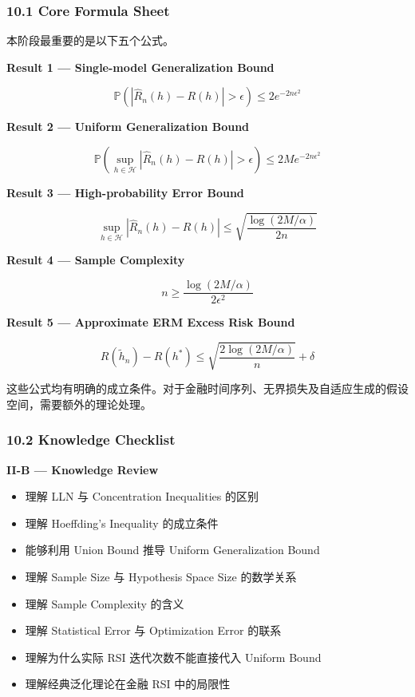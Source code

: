 \hypertarget{part-2-14-0001-core-formula-sheet}{%
\subsubsection{10.1 Core Formula Sheet}\label{part-2-14-0001-core-formula-sheet}}

本阶段最重要的是以下五个公式。

\textbf{Result 1 --- Single-model Generalization Bound}

\[\boxed{
\mathbb P(|\widehat R_n(h)-R(h)|>\epsilon)
\leq2e^{-2n\epsilon^2}
}\]

\textbf{Result 2 --- Uniform Generalization Bound}

\[\boxed{
\mathbb P
\left(
\sup_{h\in\mathcal H}
|\widehat R_n(h)-R(h)|>\epsilon
\right)
\leq2Me^{-2n\epsilon^2}
}\]

\textbf{Result 3 --- High-probability Error Bound}

\[\boxed{
\sup_{h\in\mathcal H}
|\widehat R_n(h)-R(h)|
\leq
\sqrt{\frac{\log(2M/\alpha)}{2n}}
}\]

\textbf{Result 4 --- Sample Complexity}

\[\boxed{
n\geq
\frac{\log(2M/\alpha)}{2\epsilon^2}
}\]

\textbf{Result 5 --- Approximate ERM Excess Risk Bound}

\[\boxed{
R(\tilde h_n)-R(h^*)
\leq
\sqrt{\frac{2\log(2M/\alpha)}n}+\delta
}\]

这些公式均有明确的成立条件。对于金融时间序列、无界损失及自适应生成的假设空间，需要额外的理论处理。

\hypertarget{part-2-14-0001-knowledge-checklist}{%
\subsubsection{10.2 Knowledge Checklist}\label{part-2-14-0001-knowledge-checklist}}

\textbf{II-B --- Knowledge Review}

\begin{itemize}
\item
  理解 LLN 与 Concentration Inequalities 的区别
\item
  理解 Hoeffding's Inequality 的成立条件
\item
  能够利用 Union Bound 推导 Uniform Generalization Bound
\item
  理解 Sample Size 与 Hypothesis Space Size 的数学关系
\item
  理解 Sample Complexity 的含义
\item
  理解 Statistical Error 与 Optimization Error 的联系
\item
  理解为什么实际 RSI 迭代次数不能直接代入 Uniform Bound
\item
  理解经典泛化理论在金融 RSI 中的局限性
\end{itemize}

